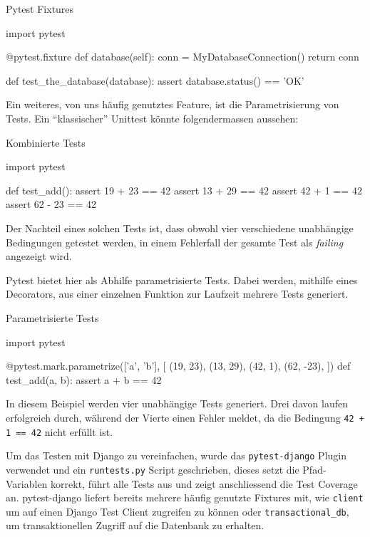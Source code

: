 \begin{listing}
\caption{Pytest Fixtures}
\label{improvements:pytest-fixtures}
\begin{pythoncode}
import pytest

@pytest.fixture
def database(self):
    conn = MyDatabaseConnection()
    return conn

def test_the_database(database):
    assert database.status() == 'OK'
\end{pythoncode}
\end{listing}

Ein weiteres, von uns häufig genutztes Feature, ist die Parametrisierung von
Tests. Ein \enquote{klassischer} Unittest könnte folgendermassen aussehen:

\begin{listing}
\caption{Kombinierte Tests}
\label{improvements:pytest-combined}
\begin{pythoncode}
import pytest

def test_add():
    assert 19 + 23 == 42
    assert 13 + 29 == 42
    assert 42 + 1 == 42
    assert 62 - 23 == 42
\end{pythoncode}
\end{listing}

Der Nachteil eines solchen Tests ist, dass obwohl vier verschiedene unabhängige
Bedingungen getestet werden, in einem Fehlerfall der gesamte Test als
\textit{failing} angezeigt wird.

Pytest bietet hier als Abhilfe parametrisierte Tests. Dabei werden, mithilfe eines
Decorators, aus einer einzelnen Funktion zur Laufzeit mehrere Tests generiert.

\begin{listing}
\caption{Parametrisierte Tests}
\label{improvements:pytest-parametrize}
\begin{pythoncode}
import pytest

@pytest.mark.parametrize(['a', 'b'], [
	(19, 23),
	(13, 29),
	(42, 1),
	(62, -23),
])
def test_add(a, b):
    assert a + b == 42
\end{pythoncode}
\end{listing}

In diesem Beispiel werden vier unabhängige Tests generiert. Drei davon laufen
erfolgreich durch, während der Vierte einen Fehler meldet, da die Bedingung
\texttt{42 + 1 == 42} nicht erfüllt ist.

Um das Testen mit Django zu vereinfachen, wurde das \texttt{pytest-django}
Plugin verwendet und ein \texttt{runtests.py} Script geschrieben, dieses setzt
die Pfad-Variablen korrekt, führt alle Tests aus und zeigt anschliessend die
Test Coverage an. pytest-django liefert bereits mehrere häufig genutzte Fixtures
mit, wie \zb \texttt{client} um auf einen Django Test Client zugreifen zu können
oder \texttt{transactional\_db}, um transaktionellen Zugriff auf die Datenbank
zu erhalten.

